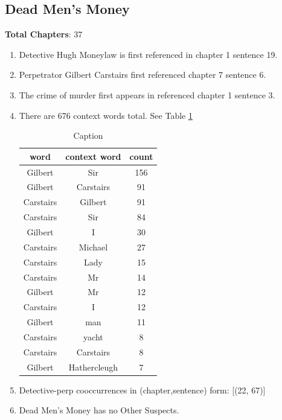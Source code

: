 \documentclass{article}
\begin{document}
\subsection{Dead Men's Money}
\textbf{Total Chapters}: 37 \\

\begin{enumerate}
    \item Detective Hugh Moneylaw is first referenced in chapter 1 sentence 19. \\
    \item Perpetrator Gilbert Carstairs first referenced chapter 7 sentence 6.\\
    \item The crime of murder first appears in referenced chapter 1 sentence 3. \\
    \item There are 676 context words total. See Table \ref{tab:dmm} \\
    \begin{table}[]
        \centering
        \begin{tabular}{c|c|c}
        word & context word & count \\ \hline
        Gilbert & Sir & 156 \\
Gilbert & Carstairs & 91 \\
Carstairs & Gilbert & 91 \\
Carstairs & Sir & 84 \\
Gilbert & I & 30 \\
Carstairs & Michael & 27 \\
Carstairs & Lady & 15 \\
Carstairs & Mr & 14 \\
Gilbert & Mr & 12 \\
Carstairs & I & 12 \\
Gilbert & man & 11 \\
Carstairs & yacht & 8 \\
Carstairs & Carstairs & 8 \\
Gilbert & Hathercleugh & 7 \\
        \end{tabular}
        \caption{Caption}
        \label{tab:dmm}
    \end{table}
    \item Detective-perp cooccurrences in (chapter,sentence) form: [(22, 67)] \\
    \item Dead Men's Money has no Other Suspects. \\
\end{enumerate}
\end{document}
